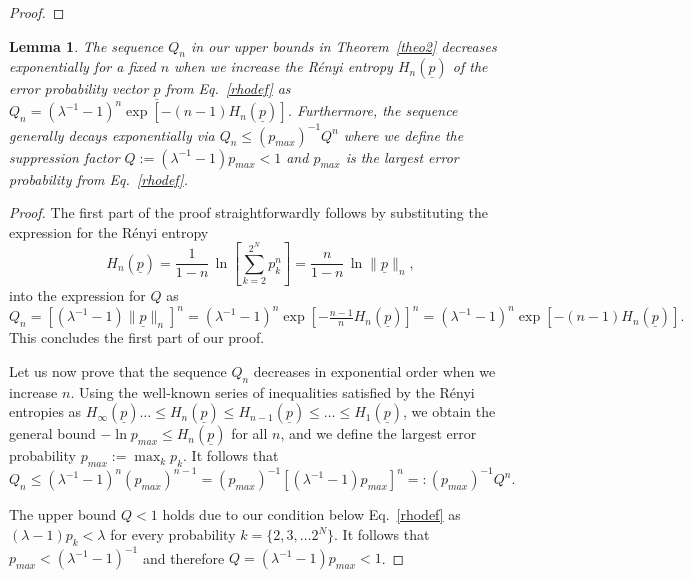 \documentclass[aps,prx,showpacs,twocolumn,reprint]{revtex4-2}
\newtheorem{lemma}{Lemma}
\newcommand{\qn}{Q_n}
\begin{document}
{\begin{proof}
\end{proof}
	
	
\begin{lemma}\label{renyilemma}
	The sequence $Q_n$ in our upper bounds in Theorem~\ref{theo2} decreases exponentially for a fixed $n$ when we increase the
	R{\'e}nyi entropy $H_n(\underline{p})$ of the error probability vector $\underline{p}$ from Eq.~\eqref{rhodef} as
	$\qn =  (\lambda^{-1}{-}1)^n \exp[ - (n{-}1) H_n(\underline{p}) ]$.
	Furthermore, the sequence generally decays exponentially via $\qn \leq  (p_{max})^{{-}1} Q^n$
	where we define the suppression factor $Q := (\lambda^{-1}{-}1) p_{max}<1$ and  $p_{max}$ is the largest error probability from Eq.~\eqref{rhodef}.
\end{lemma}
\begin{proof}
	The first part of the proof straightforwardly follows by substituting the expression for the R{\'e}nyi entropy \cite{renyi1961measures}
	\begin{equation}
	H_n(\underline{p}) = \frac{1}{1-n} \, \ln [\sum_{k=2}^{2^N} p^n_k  ]
	= \frac{n}{1-n} \, \ln \lVert \underline{p} \rVert_n,
	\end{equation}
	into the expression for $Q$ as
	\begin{equation*}
	\qn = [ (\lambda^{-1}-1) \lVert \underline{p} \rVert_n ]^n=   (\lambda^{-1}-1)^n \exp[ - \tfrac{n-1}{n} H_n(\underline{p}) ]^n
	= (\lambda^{-1}{-}1)^n \exp[ - (n{-}1) H_n(\underline{p}) ].
	\end{equation*}
	This concludes the first part of our proof.
	
	Let us now prove that the sequence $\qn$ decreases in exponential order when we increase $n$.
	Using the well-known
	series of inequalities satisfied by the R{\'e}nyi entropies
	as $H_\infty(\underline{p}) \dots \leq  H_n(\underline{p}) \leq  H_{n-1}(\underline{p}) \leq \dots \leq  H_1(\underline{p})$,
	we obtain the general bound $-\ln p_{max} \leq  H_n(\underline{p})$ for all $n$,
	and we define the largest error probability $p_{max}:= \max_k p_k$.
	It follows that	
	$$\qn \leq  (\lambda^{-1}{-}1)^n (p_{max})^{n{-}1} =  (p_{max})^{{-}1} [(\lambda^{-1}{-}1) p_{max} ]^n =: (p_{max})^{{-}1} Q^n .$$
	
		The upper bound $Q<1$ holds due to our condition below Eq.~\eqref{rhodef}
		as $(\lambda-1) p_k < \lambda$ for every probability $k=\{2,3, \dots 2^N\}$.
		It follows that $p_{max} <  (\lambda^{-1}{-}1)^{-1}$ and therefore $Q = (\lambda^{-1}{-}1) p_{max}  <1 $.
	


\end{proof}}
\end{document}
